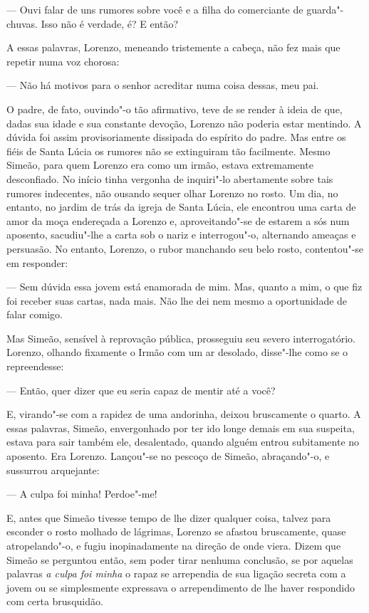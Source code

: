 --- Ouvi falar de uns rumores sobre você e a filha do comerciante de
guarda"-chuvas. Isso não é verdade, é? E então?

A essas palavras, Lorenzo, meneando tristemente a cabeça, não fez mais
que repetir numa voz chorosa:

--- Não há motivos para o senhor acreditar numa coisa dessas, meu pai.

O padre, de fato, ouvindo"-o tão afirmativo, teve de se render à ideia de
que, dadas sua idade e sua constante devoção, Lorenzo não poderia estar
mentindo. A dúvida foi assim provisoriamente dissipada do espírito do
padre. Mas entre os fiéis de Santa Lúcia os rumores não se extinguiram
tão facilmente. Mesmo Simeão, para quem Lorenzo era como um irmão,
estava extremamente desconfiado. No início tinha vergonha de inquiri"-lo
abertamente sobre tais rumores indecentes, não ousando sequer olhar
Lorenzo no rosto. Um dia, no entanto, no jardim de trás da igreja de
Santa Lúcia, ele encontrou uma carta de amor da moça endereçada a
Lorenzo e, aproveitando"-se de estarem a sós num aposento, sacudiu"-lhe a
carta sob o nariz e interrogou"-o, alternando ameaças e persuasão. No
entanto, Lorenzo, o rubor manchando seu belo rosto, contentou"-se em
responder:

--- Sem dúvida essa jovem está enamorada de mim. Mas, quanto a mim, o que
fiz foi receber suas cartas, nada mais. Não lhe dei nem mesmo a
oportunidade de falar comigo.

Mas Simeão, sensível à reprovação pública, prosseguiu seu severo
interrogatório. Lorenzo, olhando fixamente o Irmão com um ar desolado,
disse"-lhe como se o repreendesse:

--- Então, quer dizer que eu seria capaz de mentir até a você?

E, virando"-se com a rapidez de uma andorinha, deixou bruscamente o
quarto. A essas palavras, Simeão, envergonhado por ter ido longe demais
em sua suspeita, estava para sair também ele, desalentado, quando
alguém entrou subitamente no aposento. Era Lorenzo. Lançou"-se no
pescoço de Simeão, abraçando"-o, e sussurrou arquejante:

--- A culpa foi minha! Perdoe"-me!

E, antes que Simeão tivesse tempo de lhe dizer qualquer coisa, talvez
para esconder o rosto molhado de lágrimas, Lorenzo se afastou
bruscamente, quase atropelando"-o, e fugiu inopinadamente na direção de
onde viera. Dizem que Simeão se perguntou então, sem poder tirar
nenhuma conclusão, se por aquelas palavras \textit{a culpa foi minha} o rapaz
se arrependia de sua ligação secreta com a jovem ou se simplesmente
expressava o arrependimento de lhe haver respondido com certa
brusquidão.


